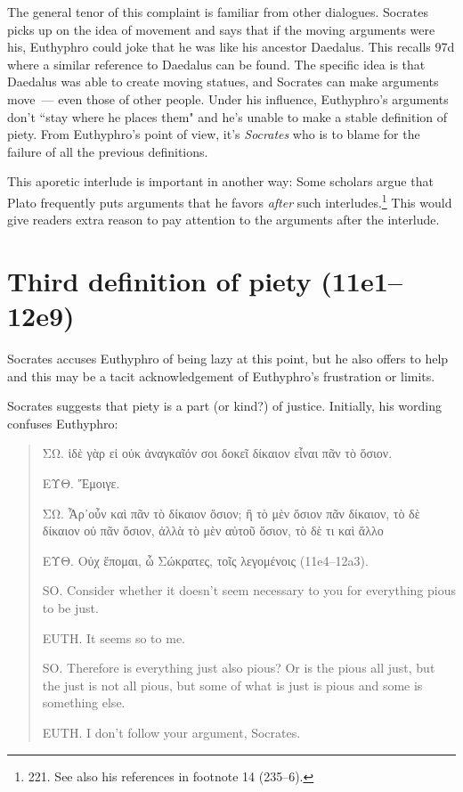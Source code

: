 \documentclass[11pt]{article}
\begin{document}
The general tenor of this complaint is familiar from other dialogues.
Socrates picks up on the idea of movement and says that if the moving
arguments were his, Euthyphro could joke that he was like his ancestor
Daedalus.  This recalls  97d where a similar reference to
Daedalus can be found.  The specific idea is that Daedalus was able to
create moving statues, and Socrates can make arguments move~--- even those
of other people.  Under his influence, Euthyphro's arguments don't ``stay
where he places them" and he's unable to make a stable definition of piety.
From Euthyphro's point of view, it's \emph{Socrates} who is to blame for
the failure of all the previous definitions.

This aporetic interlude is important in another way: Some scholars argue
that Plato frequently puts arguments that he favors \emph{after} such
interludes.\footnote{\citet{mcpherran1992} 221.  See also his references
in footnote 14 (235--6).}  This would give readers extra reason to pay
attention to the arguments after the interlude.

\section{Third definition of piety (11e1--12e9)}

Socrates accuses Euthyphro of being lazy at this point, but he also
offers to help and this may be a tacit acknowledgement of Euthyphro's
frustration or limits.

Socrates suggests that piety is a part (or kind?) of justice. Initially,
his wording confuses Euthyphro:

\begin{quote}
    ΣΩ. ἰδὲ γὰρ εἰ οὐκ ἀναγκαῖόν σοι δοκεῖ δίκαιον εἶναι πᾶν τὸ ὅσιον.

    ΕΥΘ. Ἔμοιγε.

    ΣΩ. Ἆρ᾽οὖν καὶ πᾶν τὸ δίκαιον ὅσιον; ἢ τὸ μὲν ὅσιον πᾶν δίκαιον, τὸ δὲ
    δίκαιον οὐ πᾶν ὅσιον, ἀλλὰ τὸ μὲν αὐτοῦ ὅσιον, τὸ δὲ τι καὶ ἄλλο

    ΕΥΘ. Οὐχ ἕπομαι, ὦ Σώκρατες, τοῖς λεγομένοις (11e4--12a3).

    SO. Consider whether it doesn't seem necessary to you for everything
    pious to be just.

    EUTH. It seems so to me.

    SO. Therefore is everything just also pious? Or is the pious all just,
    but the just is not all pious, but some of what is just is pious and
    some is something else.

    EUTH. I don't follow your argument, Socrates.
\end{quote}
\end{document}
